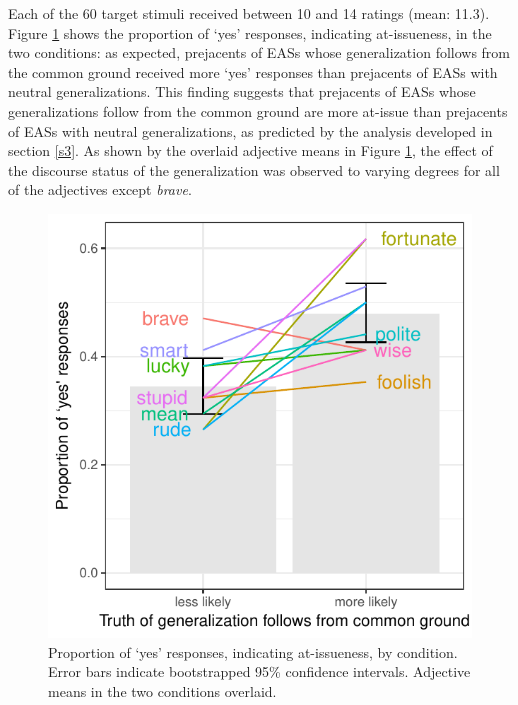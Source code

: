 \documentclass[11pt,fleqn]{article}
\newcommand{\6}{\mbox{$[\hspace*{-.6mm}[$}}
\newcommand{\9}{\mbox{$]\hspace*{-.6mm}]$}}
\begin{document}
Each of the 60 target stimuli received between 10 and 14 ratings (mean: 11.3).  Figure \ref{f-ai-by-adj} shows the proportion of `yes' responses, indicating at-issueness, in the two conditions:  as expected, prejacents of EASs whose generalization follows from the common ground  received more `yes' responses than prejacents of EASs with neutral generalizations. This finding suggests that prejacents of EASs whose generalizations follow from the common ground are more at-issue than prejacents of EASs with neutral generalizations, as predicted by the analysis developed in section \ref{s3}. As shown by the overlaid adjective means in Figure \ref{f-ai-by-adj}, the effect of the discourse status of the generalization was observed to varying degrees for all of the adjectives except {\em brave}.

\begin{figure}[H]
\begin{center}
\includegraphics[scale=.85]{../exp3-at-issueness/graphs/proportion-ai-by-condition}

\caption{Proportion of `yes' responses, indicating at-issueness, by condition. Error bars indicate bootstrapped 95\% confidence intervals. Adjective means in the two conditions overlaid.}\label{f-ai-by-adj}
\end{center}
\end{figure}
\end{document}
